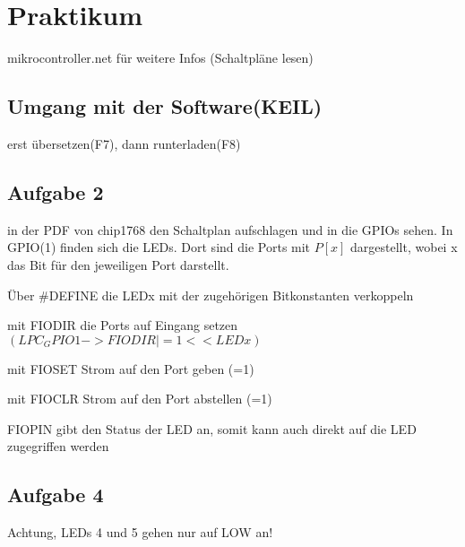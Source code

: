 \documentclass[11pt,a4paper,draft]{article}
\author{Ansgar Dabow}
\begin{document}
\tableofcontents
\newpage

\section{Praktikum}
mikrocontroller.net für weitere Infos (Schaltpläne lesen)

\subsection{Umgang mit der Software(KEIL)}

erst übersetzen(F7),
dann runterladen(F8)

\subsection{Aufgabe 2}
\begin{list}{•}{}
\item in der PDF von chip1768 den Schaltplan aufschlagen und in die GPIOs sehen. In GPIO(1) finden sich die LEDs. Dort sind die Ports mit $P[x]$ dargestellt, wobei x das Bit für den jeweiligen Port darstellt.
\item Über \#DEFINE die LEDx mit der zugehörigen Bitkonstanten verkoppeln 
\end{list}

\begin{list}{•}{}
\item mit FIODIR die Ports auf Eingang setzen \\ $(LPC_GPIO1->FIODIR |= 1<<LEDx)$
\item mit FIOSET Strom auf den Port geben 		(=1)
\item mit FIOCLR Strom auf den Port abstellen 	(=1)
\item FIOPIN gibt den Status der LED an, somit kann auch direkt auf die LED zugegriffen werden
\end{list}

\subsection{Aufgabe 4}
\begin{list}{•}{}
\item Achtung, LEDs 4 und 5 gehen nur auf LOW an!
\end{list}
\end{document}
